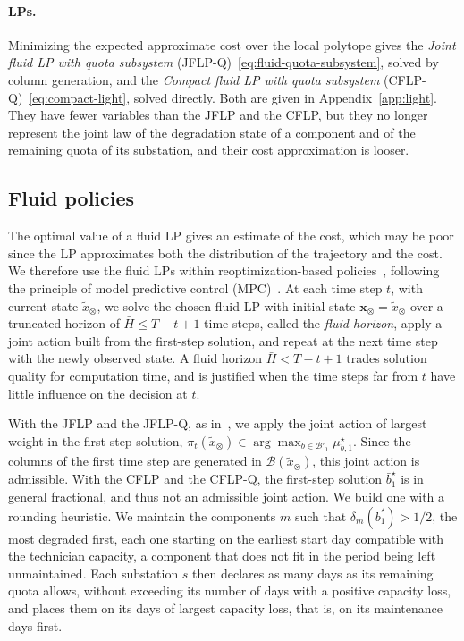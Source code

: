 \documentclass{article}
\begin{document}
\paragraph{LPs.}
Minimizing the expected approximate cost over the local polytope gives the \emph{Joint fluid LP with quota subsystem}
(JFLP-Q)~\eqref{eq:fluid-quota-subsystem}, solved by column generation, and the \emph{Compact fluid LP with quota
subsystem} (CFLP-Q)~\eqref{eq:compact-light}, solved directly. Both are given in Appendix~\ref{app:light}. They have fewer
variables than the JFLP and the CFLP, but they no longer represent the joint law of the degradation state of a
component and of the remaining quota of its substation, and their cost approximation is looser.

\subsection{Fluid policies}
\label{sec:fluid-policies}

The optimal value of a fluid LP gives an estimate of the cost, which may be poor since the LP approximates both the
distribution of the trajectory and the cost. We therefore use the fluid LPs within reoptimization-based
policies~\cite{cooper2002, bertsimas2016, gast2022lpupdate}, following the principle of model predictive control
(MPC)~\cite{mayne2000,rawlings2017}. At each time step $t$, with current state $\tilde x_\otimes$, we solve the chosen
fluid LP with initial state $\mathbf{x}_\otimes = \tilde x_\otimes$ over a truncated horizon of $\bar H \le T-t+1$ time
steps, called the \emph{fluid horizon}, apply a joint action built from the first-step solution, and repeat at the next
time step with the newly observed state. A fluid horizon $\bar H < T-t+1$ trades solution quality for computation time,
and is justified when the time steps far from $t$ have little influence on the decision at $t$.

With the JFLP and the JFLP-Q, as in~\cite{bertsimas2016}, we apply the joint action of largest weight in the first-step
solution, $\pi_t(\tilde x_\otimes)\in\arg\max_{b\in\mathcal{B}'_1}\mu^\star_{b,1}$. Since the columns of the first time
step are generated in $\mathcal{B}(\tilde x_\otimes)$, this joint action is admissible. With the CFLP and the CFLP-Q,
the first-step solution $\bar b_1^\star$ is in general fractional, and thus not an admissible joint action. We build
one with a rounding heuristic. We maintain the components $m$ such that $\delta_m(\bar b_1^\star) > 1/2$, the most
degraded first, each one starting on the earliest start day compatible with the technician capacity, a component that
does not fit in the period being left unmaintained. Each substation $s$ then declares as many days as its remaining
quota allows, without exceeding its number of days with a positive capacity loss, and places them on its days of
largest capacity loss, that is, on its maintenance days first.
\end{document}
